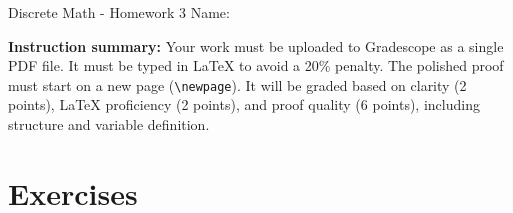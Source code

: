 \documentclass[12pt]{article}
\begin{document}
\begin{center}
    {\LARGE Discrete Math - Homework 3} \Large \newline
    Name:
\end{center}

\vspace{1em}

\noindent \textbf{Instruction summary:} Your work must be uploaded to Gradescope as a single PDF file. It must be typed in LaTeX to avoid a 20\% penalty. The polished proof must start on a new page (\texttt{\textbackslash newpage}). It will be graded based on clarity (2 points), LaTeX proficiency (2 points), and proof quality (6 points), including structure and variable definition.

\section*{Exercises}
\end{document}
